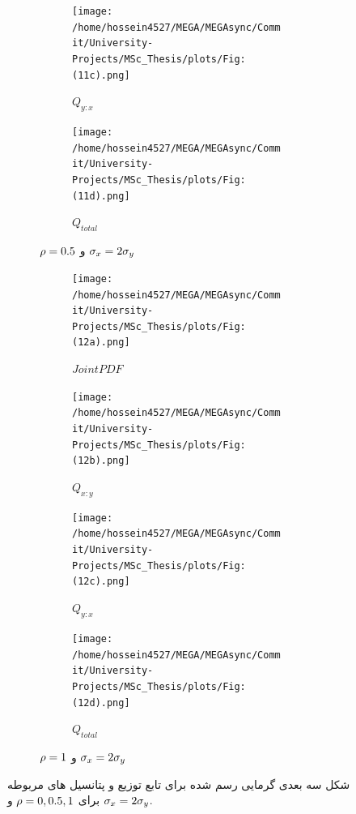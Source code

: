 \documentclass[a4paper,titlepage,12pt,fleqn,oneside]{report}
\begin{document}
\begin{figure}[tbp]
\begin{subfigure}[b]{\textwidth}
\begin{subfigure}[b]{0.24\textwidth}
			\renewcommand\thesubfigure{iii}
			\centering
			\texttt{[image: /home/hossein4527/MEGA/MEGAsync/Commit/University-Projects/MSc\_Thesis/plots/Fig:(11c).png]}
			\caption{$Q_{y:x}$}
			\label{fig:3.2.3}
		\end{subfigure}
		\hfill
		\begin{subfigure}[b]{0.24\textwidth}
			\renewcommand\thesubfigure{iv}
			\centering
			\texttt{[image: /home/hossein4527/MEGA/MEGAsync/Commit/University-Projects/MSc\_Thesis/plots/Fig:(11d).png]}
			\caption{$Q_{total}$}
			\label{fig:3.2.4}
		\end{subfigure}
		\caption{$\protect\rho =0.5$ و $\protect\sigma _{x}=2\protect\sigma _{y}$}
		\label{fig:3.2}
	\end{subfigure}
	\begin{subfigure}[b]{\textwidth}
		\renewcommand\thesubfigure{c}
		\begin{subfigure}[b]{0.24\textwidth}
			\renewcommand\thesubfigure{i}
			\centering
			\texttt{[image: /home/hossein4527/MEGA/MEGAsync/Commit/University-Projects/MSc\_Thesis/plots/Fig:(12a).png]}
			\caption{$Joint PDF$}
			\label{fig:3.3.1}
		\end{subfigure}
		\hfill
		\begin{subfigure}[b]{0.24\textwidth}
			\renewcommand\thesubfigure{ii}
			\centering
			\texttt{[image: /home/hossein4527/MEGA/MEGAsync/Commit/University-Projects/MSc\_Thesis/plots/Fig:(12b).png]}
			\caption{$Q_{x:y}$}
			\label{fig:3.3.2}
		\end{subfigure}
		\hfill
		\begin{subfigure}[b]{0.24\textwidth}
			\renewcommand\thesubfigure{iii}
			\centering
			\texttt{[image: /home/hossein4527/MEGA/MEGAsync/Commit/University-Projects/MSc\_Thesis/plots/Fig:(12c).png]}
			\caption{$Q_{y:x}$}
			\label{fig:3.3.3}
		\end{subfigure}
		\hfill
		\begin{subfigure}[b]{0.24\textwidth}
			\renewcommand\thesubfigure{iv}
			\centering
			\texttt{[image: /home/hossein4527/MEGA/MEGAsync/Commit/University-Projects/MSc\_Thesis/plots/Fig:(12d).png]}
			\caption{$Q_{total}$}
			\label{fig:3.3.4}
		\end{subfigure}		
		\caption{$\protect\rho =1$ و $\protect\sigma _{x}=2\protect\sigma _{y}$}
		\label{fig:3.3}
	\end{subfigure}
	\caption{شکل سه بعدی گرمایی رسم شده برای تابع توزیع و پتانسیل های مربوطه برای
		$\protect\rho =0,0.5,1$ و $\protect\sigma _{x}=2\protect\sigma %
		_{y}$.}
	\label{fig:3t}
\end{figure}
\end{document}
